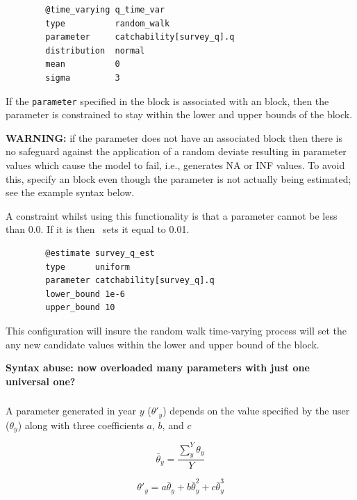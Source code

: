 {\small{\begin{verbatim}
		@time_varying q_time_var
		type          random_walk
		parameter     catchability[survey_q].q
		distribution  normal
		mean          0
		sigma         3
		\end{verbatim}}}

If the \texttt{parameter} specified in the  block is associated with an  block, then the parameter is constrained to stay within the lower and upper bounds of the  block.

\textbf{WARNING:} if the parameter does not have an associated  block then there is no safeguard against the application of a random deviate resulting in parameter values which cause the model to fail, i.e., generates NA or INF values. To avoid this, specify an  block even though the parameter is not actually being estimated; see the example syntax below.

A constraint whilst using this functionality is that a parameter cannot be less than 0.0. If it is then \CNAME~sets it equal to 0.01.

{\small{\begin{verbatim}
		@estimate survey_q_est
		type      uniform
		parameter catchability[survey_q].q
		lower_bound 1e-6
		upper_bound 10
		\end{verbatim}}}
	
This configuration will insure the random walk time-varying process will set the any new candidate values within the lower and upper bound of the  block.

\textbf{ Syntax abuse: now overloaded many parameters with just one universal one?}
\subsubsection[Annual shift]{}

A parameter generated in year $y$ ($\theta'_y$) depends on the value specified by the user ($\theta_y$) along with three coefficients $a$, $b$, and $c$

\begin{equation}
\bar{\theta}_y = \frac{\sum_{y}^Y\theta_y}{Y}
\end{equation}

\begin{equation}
\theta'_y = a \bar{\theta}_y + b\bar{\theta}_y^{2} + c\bar{\theta}_y^{3}
\end{equation}

